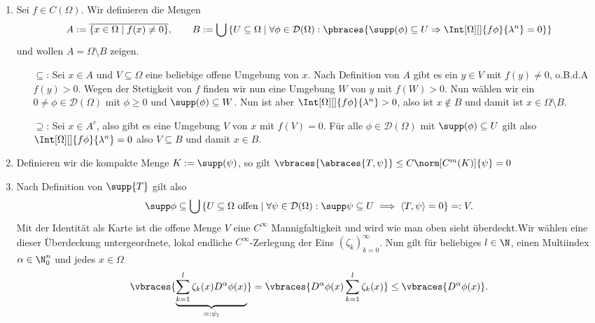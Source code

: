 \begin{solution}
\phantom{}
\begin{enumerate}[label = (\roman*)]
	\item Sei $f \in C(\Omega)$. Wir definieren die Mengen
	\begin{align*}
	A := \overline{\{x \in \Omega \mid f(x) \neq 0 \}}, \qquad B := \bigcup \left\{U \subseteq \Omega \mid \forall \phi \in \mathcal{D}(\Omega): \pbraces{\supp(\phi) \subseteq U \Rightarrow \Int[\Omega][]{f\phi}{\lambda^n} = 0} \right\}
	\end{align*}
	und wollen $A = \Omega \setminus B$ zeigen.
	\begin{enumerate}
		\item[$\subseteq$:] Sei $x \in A$ und $V \subseteq \Omega$ eine beliebige offene Umgebung von $x$. Nach Definition von $A$ gibt es ein $y \in V$ mit $f(y) \neq 0$, o.B.d.A $f(y) > 0$. Wegen der Stetigkeit von $f$ finden wir nun eine Umgebung $W$ von $y$ mit $f(W) > 0$. Nun wählen wir ein $0 \neq \phi \in \mathcal{D}(\Omega)$ mit $\phi \geq 0$ und $\supp(\phi) \subseteq W$. Nun ist aber $\Int[\Omega][]{f\phi}{\lambda^n} > 0$, also ist $x \notin B$ und damit ist $x \in \Omega \setminus B$.
		\item[$\supseteq$:] Sei $x \in A^c$, also gibt es eine Umgebung $V$ von $x$ mit $f(V) = 0$. Für alle $\phi \in \mathcal{D}(\Omega)$ mit $\supp(\phi) \subseteq U$ gilt also $\Int[\Omega][]{f\phi}{\lambda^n} = 0$ also $V \subseteq B$ und damit $x \in B$.
	\end{enumerate}
	\item Definieren wir die kompakte Menge $K := \supp(\psi)$, so gilt $\vbraces{\abraces{T, \psi}} \leq C \norm[C^m(K)]{\psi} = 0$
	\item Nach Definition von $\supp{T}$ gilt also
\begin{align}
    \supp\phi \subseteq \bigcup \left\{U \subseteq \Omega \text{~offen} \mid \forall \psi \in \mathcal{D}(\Omega): \supp\psi \subseteq U \implies \langle T, \psi\rangle = 0 \right\} =: V.
\end{align}
Mit der Identität als Karte ist die offene Menge $V$ eine $C^\infty$ Mannigfaltigkeit und wird wie man oben sieht überdeckt.Wir wählen eine dieser Überdeckung untergeordnete, lokal endliche $C^\infty$-Zerlegung der Eins $(\zeta_k)_{k=0}^\infty$. Nun gilt für beliebiges $l \in \N$, einen Multiindex $\alpha \in \N_0^n$ und jedes $x \in \Omega$
\begin{align*}
\vbraces{\underbrace{\sum_{k=1}^l \zeta_k(x) D^\alpha \phi(x)}_{=:\psi_l}} =  \vbraces{D^\alpha \phi(x) \sum_{k=1}^l \zeta_k(x) } \leq \vbraces{D^\alpha \phi(x)}.

\end{align*}
\end{enumerate}
\end{solution}
